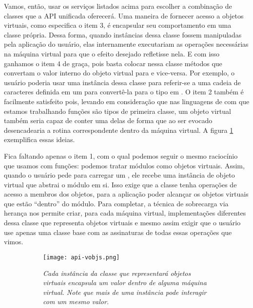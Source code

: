     Vamos, então, usar os serviços listados acima para escolher a combinação de
    classes que a API unificada oferecerá. Uma maneira de fornecer acesso a
    objetos virtuais, como especifica o item 3, é encapsular seu comportamento
    em uma classe própria. Dessa forma, quando instâncias dessa classe fossem
    manipuladas pela aplicação do usuário, elas internamente executariam as
    operações necessárias na máquina virtual para que o efeito desejado
    refletisse nela. E com isso ganhamos o item 4 de graça, pois basta colocar
    nessa classe métodos que convertam o valor interno do objeto virtual para
    \CXX{} e vice-versa. Por exemplo, o usuário poderia usar uma instância dessa
    classe para referir-se a uma cadeia de caracteres definida em um \script{}
    para convertê-la para o tipo  em \CXX{}. O item 2 também
    é facilmente satisfeito pois, levando em consideração que nas linguagens de
    \script{} com que estamos trabalhando funções são tipos de primeira
    classe\footnotemark{}, um objeto virtual também seria capaz de conter uma
    delas de forma que ao ser evocado desencadearia a rotina correspondente
    dentro da máquina virtual. A figura \ref{fig:api-vobjs} exemplifica essas
    ideias.


    Fica faltando apenas o item 1, com o qual podemos seguir o mesmo raciocínio
    que usamos com funções: podemos tratar módulos como objetos virtuais. Assim,
    quando o usuário pede para carregar um \script{}, ele recebe uma instância
    de objeto virtual que abstrai o módulo em si. Isso exige que a classe
    tenha operações de acesso a membros dos objetos, para a aplicação poder
    alcançar os objetos virtuais que estão ``dentro'' do módulo. Para completar,
    a técnica de sobrecarga via herança nos permite criar, para cada máquina
    virtual, implementações diferentes dessa classe que representa objetos
    virtuais e mesmo assim exigir que o usuário use apenas uma classe base com
    as assinaturas de todas essas operações que vimos. 

    \begin{figure}[ht]
      \centering
      \caption{}
      \begin{subfigure}{.8\textwidth}
        \begin{center}
          \texttt{[image: api-vobjs.png]}
          \vspace{1em}

          \textit{
            Cada instância da classe que representará objetos virtuais encapsula
            um valor dentro de alguma máquina virtual. Note que mais de uma
            instância pode interagir com um mesmo valor.
          }
        \end{center}
      \end{subfigure}
      \label{fig:api-vobjs}
    \end{figure}

